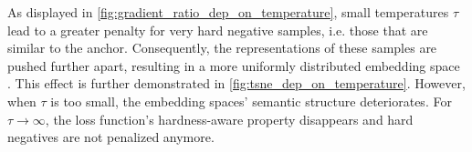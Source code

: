 As displayed in \autoref{fig:gradient_ratio_dep_on_temperature}, 
small temperatures $\tau$ lead to a greater penalty for very hard negative samples, i.e. those that are similar to the anchor.
Consequently, the representations of these samples are pushed further apart, 
resulting in a more uniformly distributed embedding space \citep{CL_temp_2021,grape_2024}. 
This effect is further demonstrated in \autoref{fig:tsne_dep_on_temperature}.
However, when $\tau$ is too small, the embedding spaces' semantic structure deteriorates.
For $\tau \rightarrow \infty$, the loss function's hardness-aware property disappears and hard negatives are not penalized anymore.